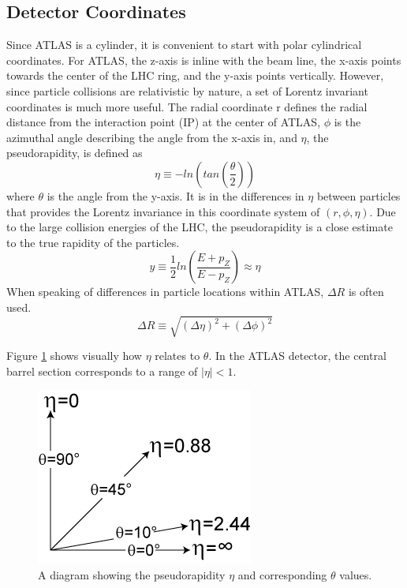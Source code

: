 	\subsection{Detector Coordinates}\label{ssec:coordinates}
	Since ATLAS is a cylinder, it is convenient to start with polar cylindrical coordinates. For ATLAS, the z-axis is inline with the beam line, the x-axis points towards the center of the LHC ring, and the y-axis points vertically. However, since particle collisions are relativistic by nature, a set of Lorentz invariant coordinates is much more useful. The radial coordinate r defines the radial distance from the interaction point (IP) at the center of ATLAS, $\phi$ is the azimuthal angle describing the angle from the x-axis in, and $\eta$, the pseudorapidity, is defined as 
	\begin{equation}\label{eqn:eta}
	\eta \equiv - ln(tan(\frac{\theta}{2}))
	\end{equation}
	where $\theta$ is the angle from the y-axis. It is in the differences in $\eta$ between particles that provides the Lorentz invariance in this coordinate system of $(r,\phi,\eta)$. Due to the large collision energies of the LHC, the pseudorapidity is a close estimate to the true rapidity of the particles. 
	\begin{equation}\label{eqn:rapidity}
	y \equiv \frac{1}{2} ln(\frac{E+p_Z}{E-p_Z}) \approx \eta
	\end{equation}
	When speaking of differences in particle locations within ATLAS, $\Delta R$  is often used.
	\begin{equation}\label{eqn:dR}
	\Delta R \equiv \sqrt{ (\Delta \eta)^2 + (\Delta \phi)^2}
	\end{equation}

	Figure \ref{fig:pseudorapidity} shows visually how $\eta$ relates to $\theta$. In the ATLAS detector, the central barrel section corresponds to a range of $|\eta|<1$. 

	\begin{figure}[!ht]
	\centering
	\includegraphics[width=.25\textwidth,keepaspectratio=true]{chapters/chapter3_experiment/images/Pseudorapidity.png}
	\caption{ A diagram showing the pseudorapidity $\eta$ and corresponding $\theta$ values. \cite{pseudorapidity} }
	\label{fig:pseudorapidity}
	\end{figure}

